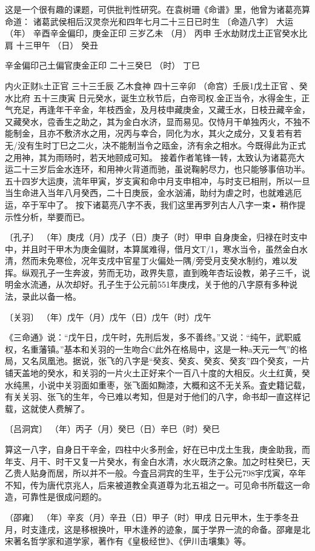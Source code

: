 \documentclass[a5paper,oneside,12pt]{ctexbook}
\begin{document}
这是一个很有趣的课题，可供批判性研究。在袁树珊《命谱》里，他曾为诸葛亮算命道：
诸葛武侯相后汉灵奈光和四年七月二十三日已时生
〔命造八字〕	大运
（年）	辛酉辛金偏印，庚金正印		三岁乙未
（月）	丙申	壬水劫财戊土正官癸水比肩	十三甲午
（日）	癸丑	{辛金偏印己土偏官庚金正印	二十三癸巳
（时）	丁巳	{内火正财k土正官	三十三壬辰
乙木食神	四十三辛卯
（命宫）壬辰1戊土正官
、癸水比府	五十三庚寅
日元癸水，诞生立秋节后，白帝司权.金正当令，水得金生，正气充足，再逢年干辛金，年枝西金，及月枝申藏庚金，又藏壬水，日枝丑藏辛金，又藏癸水，卺香生之助之，其为金白水济，显而易见。仅恃月干单独丙火，不独不能制金，且亦不敷济水之用，况丙与幸合，同化为水，其火之成分，又复若有若无/没有生时丁巳之二火，决不能制当令之瓯金，济有余之相水。今既得此为正式之用神，其为雨旸时，若天地颐成可知。
接着作者笔锋一转，太致认为诸葛亮大运二十三岁后金水连环，和用神火背道而驰，虽说鞠躬尽力，也只能够事倍功半。五十四岁大运庚，流年甲寅，岁支寅和命中月支申相冲，与时支已相刑，所以一旦当生命进入当年八月癸西，二十日庚辰，金水汹浦，助纣为虐之时，也就难逃厄运，卒于军中了。
按下诸葛亮八字不表，我们这里再罗列古人八字一束•
稍作提示性分析，举要而已。

〔孔子〕
（年）庚戌（月）戊子（日）庚子（时）甲申
自身庚金，归禄在时支中中，并且时干甲木为庚金偏财，本算属难得，借月文T/1，寒水当令，虽然金白水清，然而未免寒俭，况年支戌中官星丁火偏处一隅/旁受月支癸水制约，难以发挥。纵观孔子一生奔波，劳而无功，政界失意，直到晚年杏坛设教，弟子三千，说明金水流通，从次却好。孔子生于公元前551年庚戌，关于他的八字原有多种说法，录此以备一格。

〔关羽〕
（年）戊午（月）戊午（日）戊午（时）戊午

《三命通》说：“戊午日，戊午时，先刑后发，多不善终。”又说：“纯午，武职威权，名重藩镇。”基本和关羽的一生吻合C此外在格局中，这是一种a天元一气”的格局，又名凤凰池。据说，张飞的八字是“癸亥、癸亥、癸亥、癸亥”四个癸亥，一片铺天盖地的癸水，和关羽的一片火土正好来个一百八十度的大相反。火土红黄，癸水纯黑，小说中关羽面如重枣，张飞面如黝漆，大概和这不无关系。査史籍记载，有关关羽、张飞的生年，今已难以考知，但是对于他们的八字，命书却一直这样记载，这就使人费解了。

〔吕洞宾〕
（年）丙子（月）癸巳（日）辛巳（时）癸巳

算这一八字，自身日干辛金，四柱中火多刑金，好在已中戊土生我，庚金助我，而年支、月干、时干又复一片癸水，有金白水清，水火既济之象。加之时柱癸巳，天乙贵人贴身而居，所以并不一般。今査吕洞宾的生平，生于公元798宇戊寅，卒年不知，传为唐代京兆人，后来被道教全真道尊为北五祖之一。可见命书所载这一命造，可靠性是很成问题的。

（邵雍〕
（年）辛亥（月）辛丑（日）甲子（时）甲戌
日元甲木，生于季冬丑月，时支逢戌，这是移根换叶，甲木逢养的迹象，属于学界一流的命备。邵雍是北宋著名哲学家和道学家，著作有《皇极经世》、《伊川击壤集》等。

}}
\end{document}
